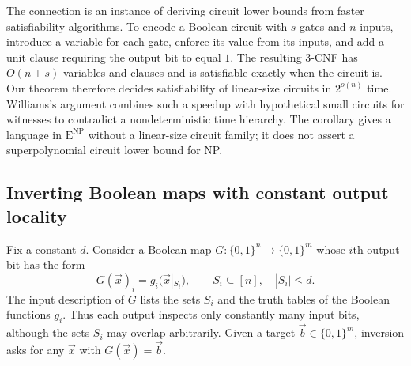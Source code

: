 \documentclass[11pt,reqno]{amsart}
\numberwithin{equation}{section}
\theoremstyle{definition}\newtheorem{definition}[theorem]{Definition}
\theoremstyle{remark}\newtheorem{remark}[theorem]{Remark}
\renewcommand{\le}{\leqslant}
\begin{document}
The connection is an instance of deriving circuit lower bounds from
faster satisfiability algorithms. To encode a Boolean circuit with $s$
gates and $n$ inputs, introduce a variable for each gate, enforce its
value from its inputs, and add a unit clause requiring the output bit
to equal $1$. The resulting $3$-CNF has $O(n+s)$ variables and clauses
and is satisfiable exactly when the circuit is. Our theorem therefore
decides satisfiability of linear-size circuits in $2^{o(n)}$ time.
Williams's argument combines
such a speedup with hypothetical small circuits for witnesses to
contradict a nondeterministic time hierarchy. The corollary gives a
language in $\mathrm E^{\mathrm{NP}}$ without a linear-size circuit
family; it does not assert a superpolynomial circuit lower bound for NP.



\subsection{Inverting Boolean maps with constant output locality}\label{subsec:local-inversion}
Fix a constant $d$. Consider a Boolean map
$G:\{0,1\}^n\to\{0,1\}^m$ whose $i$th output bit has the form
\[
 G(\vec{x})_i=g_i(\vec{x}|_{S_i}),
 \qquad S_i\subseteq[n],\quad |S_i|\le d.
\]
The input description of $G$ lists the sets $S_i$ and the truth
tables of the Boolean functions $g_i$. Thus each output inspects
only constantly many input bits, although the sets $S_i$ may overlap
arbitrarily. Given a target $\vec{b}\in\{0,1\}^m$, inversion asks
for any $\vec{x}$ with $G(\vec{x})=\vec{b}$.
\end{document}
